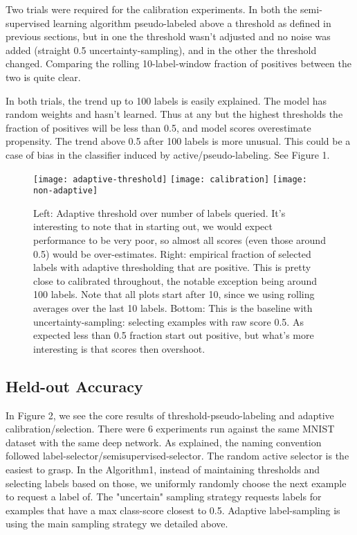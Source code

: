 \documentclass{article}
\begin{document}
Two trials were required for the calibration experiments.  In both the semi-supervised learning algorithm pseudo-labeled above a threshold as defined in previous sections, but in one the threshold wasn't adjusted and no noise was added (straight 0.5 uncertainty-sampling), and in the other the threshold changed.  Comparing the rolling 10-label-window fraction of positives between the two is quite clear.  

In both trials, the trend up to 100 labels is easily explained.  The model has random weights and hasn't learned.  Thus at any but the highest thresholds the fraction of positives will be less than 0.5, and model scores overestimate propensity.  The trend above 0.5 after 100 labels is more unusual.  This could be a case of bias in the classifier induced by active/pseudo-labeling.  See Figure 1.  

\begin{figure}[h]
  \center 
  \texttt{[image: adaptive-threshold]}
  \texttt{[image: calibration]}
  \texttt{[image: non-adaptive]}
  \caption{Left: Adaptive threshold over number of labels queried.  It's interesting to note that in starting out, we would expect performance to be very poor, so almost all scores (even those around 0.5) would be over-estimates.  
  Right: empirical fraction of selected labels with adaptive thresholding that are positive.  This is pretty close to calibrated throughout, the notable exception being around 100 labels.  Note that all plots start after 10, since we using rolling averages over the last 10 labels.  
  Bottom: This is the baseline with uncertainty-sampling: selecting examples with raw score 0.5.  As expected less than 0.5 fraction start out positive, but what's more interesting is that scores then overshoot.  }
\end{figure}
\subsection{Held-out Accuracy}
In Figure 2, we see the core results of threshold-pseudo-labeling and adaptive calibration/selection.  There were 6 experiments run against the same MNIST dataset with the same deep network.  As explained, the naming convention followed label-selector/semisupervised-selector.  The random active selector is the easiest to grasp.  In the Algorithm1, instead of maintaining thresholds and selecting labels based on those, we uniformly randomly choose the next example to request a label of.  The "uncertain" sampling strategy requests labels for examples that have a max class-score closest to 0.5.  Adaptive label-sampling is using the main sampling strategy we detailed above.
\end{document}
